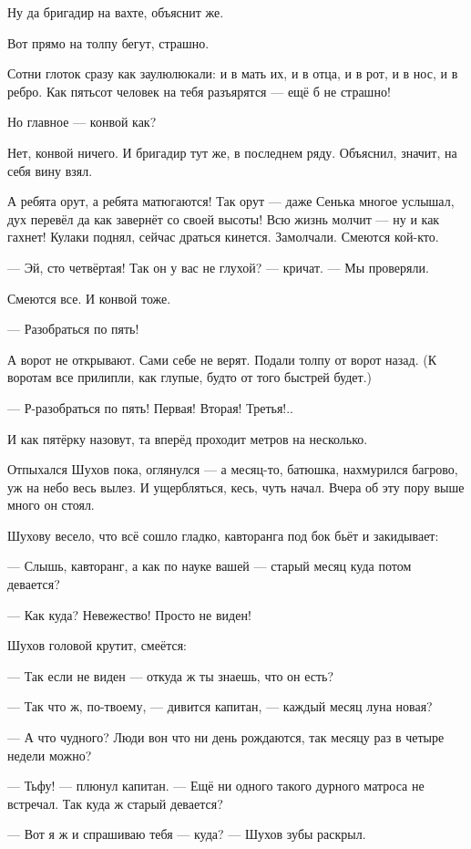 Ну да бригадир на вахте, объяснит же.

Вот прямо на толпу бегут, страшно.

Сотни глоток сразу как заулюлюкали: и в мать их, и в отца, и в рот, и в нос, и в ребро. Как
пятьсот человек на тебя разъярятся --- ещё б не страшно!

Но главное --- конвой как?

Нет, конвой ничего. И бригадир тут же, в последнем ряду. Объяснил, значит, на себя вину взял.

А ребята орут, а ребята матюгаются! Так орут --- даже Сенька многое услышал, дух перевёл да как
завернёт со своей высоты! Всю жизнь молчит --- ну и как гахнет! Кулаки поднял, сейчас драться
кинется. Замолчали. Смеются кой-кто.

--- Эй, сто четвёртая! Так он у вас не глухой? --- кричат. --- Мы проверяли.

Смеются все. И конвой тоже.

--- Разобраться по пять!

А ворот не открывают. Сами себе не верят. Подали толпу от ворот назад. (К воротам все прилипли,
как глупые, будто от того быстрей будет.)

--- Р-разобраться по пять! Первая! Вторая! Третья!..

И как пятёрку назовут, та вперёд проходит метров на несколько.

Отпыхался Шухов пока, оглянулся --- а месяц-то, батюшка, нахмурился багрово, уж на небо весь
вылез. И ущербляться, кесь, чуть начал. Вчера об эту пору выше много он стоял.

Шухову весело, что всё сошло гладко, кавторанга под бок бьёт и закидывает:

--- Слышь, кавторанг, а как по науке вашей --- старый месяц куда потом девается?

--- Как куда? Невежество! Просто не виден!

Шухов головой крутит, смеётся:

--- Так если не виден --- откуда ж ты знаешь, что он есть?

--- Так что ж, по-твоему, --- дивится капитан, --- каждый месяц луна новая?

--- А что чудного? Люди вон что ни день рождаются, так месяцу раз в четыре недели можно?

--- Тьфу! --- плюнул капитан. --- Ещё ни одного такого дурного матроса не встречал. Так куда ж
старый девается?

--- Вот я ж и спрашиваю тебя --- куда? --- Шухов зубы раскрыл.

